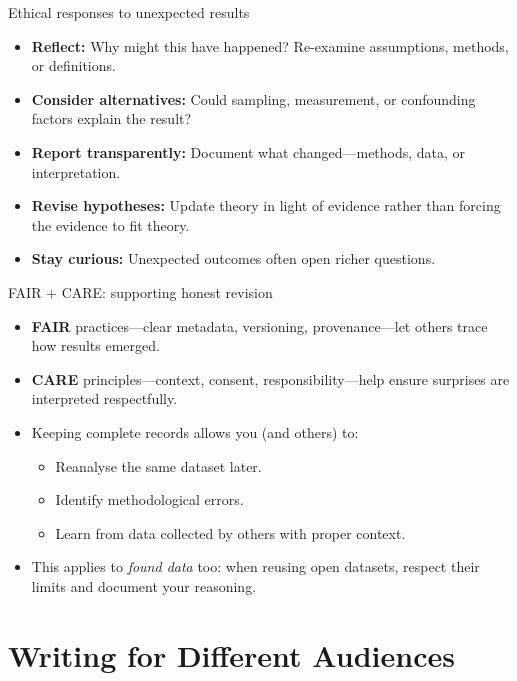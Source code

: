 \documentclass[aspectratio=169]{beamer}
\begin{document}
\begin{frame}{Ethical responses to unexpected results}
\begin{itemize}
  \item \textbf{Reflect:} Why might this have happened? Re-examine assumptions, methods, or definitions.  
  \item \textbf{Consider alternatives:} Could sampling, measurement, or confounding factors explain the result?  
  \item \textbf{Report transparently:} Document what changed—methods, data, or interpretation.  
  \item \textbf{Revise hypotheses:} Update theory in light of evidence rather than forcing the evidence to fit theory.  
  \item \textbf{Stay curious:} Unexpected outcomes often open richer questions.
\end{itemize}
\end{frame}

\begin{frame}{FAIR + CARE: supporting honest revision}
\begin{itemize}
  \item \textbf{FAIR} practices—clear metadata, versioning, provenance—let others trace how results emerged.  
  \item \textbf{CARE} principles—context, consent, responsibility—help ensure surprises are interpreted respectfully.  
  \item Keeping complete records allows you (and others) to:  
    \begin{itemize}
      \item Reanalyse the same dataset later.  
      \item Identify methodological errors.  
      \item Learn from data collected by others with proper context.  
    \end{itemize}
  \item This applies to \emph{found data} too: when reusing open datasets, respect their limits and document your reasoning.
\end{itemize}

\end{frame}

\section{Writing for Different Audiences}
\end{document}
